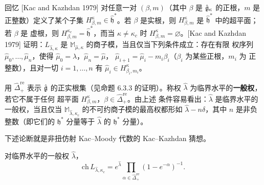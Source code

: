 回忆 [Kac and Kazhdan 1979] 对任意一对 $(\beta,m)$（其中 $\beta$ 是
$\hat{\mathfrak{g}}_\kappa$ 的正根，$m$ 是正整数）定义了某个子集
$H^\kappa_{\beta,m}\in\widehat{\mathfrak h}^*$。若 $\beta$ 是实根，则
$H^\kappa_{\beta,m}$ 是 $\widehat{\mathfrak h}^*$ 中的超平面；若 $\beta$ 是
虚根，则 $H^{\kappa_c}_{\beta,m}=\widehat{\mathfrak h}^*$，而当
$\kappa\ne\kappa_c$ 时 $H^\kappa_{\beta,m}=\varnothing$。[Kac and Kazhdan
1979] 证明：$L_{\widehat\lambda,\kappa}$ 是
$\mathbb M_{\widehat\mu,\kappa}$ 的商子模，当且仅当下列条件成立：存在有限
权序列 $\widehat\mu_0,\dots,\widehat\mu_n$，使得
$\widehat\mu_0=\widehat\lambda$，$\widehat\mu_n=\widehat\mu$，
$\widehat\mu_{i+1}=\widehat\mu_i-m_i\beta_i$（$\beta_i$ 为某些正根，$m_i$ 为
正整数），且对一切 $i=1,\dots,n$ 有
$\widehat\mu_i\in H^\kappa_{\beta_i,m_i}$。

用 $\widehat\Delta^{\mathrm{re}}_+$ 表示 $\hat{\mathfrak{g}}$ 的正实根集（见命题 6.3.3
的证明）。称权 $\widehat\lambda$ 为临界水平的\textbf{一般权}，若它不属于任何
超平面 $H^\kappa_{\beta,m}$，$\beta\in\widehat\Delta^{\mathrm{re}}_+$。由上述
条件容易看出：$\widehat\lambda$ 是临界水平的一般权，当且仅当
$\mathbb M_{\widehat\lambda,\kappa_c}$ 的不可约商子模的最高权都形如
$\widehat\lambda-n\delta$，其中 $n$ 是非负整数（即它们的 $\mathfrak h^*$
分量等于 $\widehat\lambda$ 的 $\mathfrak h^*$ 分量）。

下述论断就是非扭仿射 Kac--Moody 代数的 Kac--Kazhdan 猜想。

\renewcommand{\thetheorem}{6.4.1}
\begin{theorem}
    对临界水平的一般权 $\widehat\lambda$，
    \[
        \mathrm{ch}\,L_{\widehat\lambda,\kappa_c}
        =e^{\widehat\lambda}\prod_{\alpha\in
        \widehat\Delta^{\mathrm{re}}_+}(1-e^{-\alpha})^{-1}.
    \]
\end{theorem}

